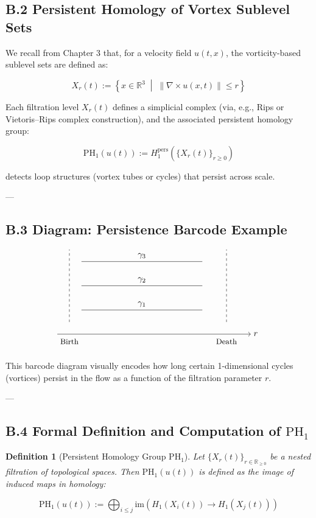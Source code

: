 \documentclass[11pt]{article}
\newtheorem{definition}[theorem]{Definition}
\begin{document}
\subsection*{B.2 Persistent Homology of Vortex Sublevel Sets}

We recall from Chapter 3 that, for a velocity field \( u(t,x) \), the vorticity-based sublevel sets are defined as:

\[
X_r(t) := \left\{ x \in \mathbb{R}^3 \;\middle|\; \| \nabla \times u(x,t) \| \le r \right\}
\]

Each filtration level \( X_r(t) \) defines a simplicial complex (via, e.g., Rips or Vietoris–Rips complex construction), and the associated persistent homology group:

\[
\mathrm{PH}_1(u(t)) := H_1^{\mathrm{pers}} \left( \{ X_r(t) \}_{r \ge 0} \right)
\]

detects loop structures (vortex tubes or cycles) that persist across scale.

---

\subsection*{B.3 Diagram: Persistence Barcode Example}

\[
\begin{tikzpicture}
\draw[->] (0,0) -- (8,0) node[right] {\( r \)};
\foreach \y/\label in {1/$\gamma_1$, 2/$\gamma_2$, 3/$\gamma_3$} {
  \draw (1,\y) -- (6,\y) node[midway, above] {\label};
}
\draw[dashed] (0.5,0.5) -- (0.5,3.5);
\draw[dashed] (7,0.5) -- (7,3.5);
\node at (0.5,-0.3) {\small Birth};
\node at (7,-0.3) {\small Death};
\end{tikzpicture}
\]

This barcode diagram visually encodes how long certain 1-dimensional cycles (vortices) persist  
in the flow as a function of the filtration parameter \( r \).

---

\subsection*{B.4 Formal Definition and Computation of \( \mathrm{PH}_1 \)}

\begin{definition}[Persistent Homology Group \( \mathrm{PH}_1 \)]
Let \( \{ X_r(t) \}_{r \in \mathbb{R}_{\ge 0}} \) be a nested filtration of topological spaces.  
Then \( \mathrm{PH}_1(u(t)) \) is defined as the image of induced maps in homology:

\[
\mathrm{PH}_1(u(t)) := \bigoplus_{i \le j} \mathrm{im}\left( H_1(X_i(t)) \to H_1(X_j(t)) \right)
\]
\end{definition}
\end{document}
